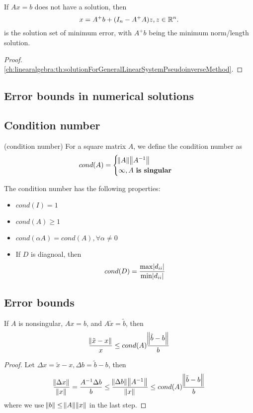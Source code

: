 \begin{refsection}
\begin{theorem}
	If $Ax = b$ does not have a solution, then
	$$x = A^+b + (I_n - A^+A)z, z\in \mathbb{R}^n.$$
	is the solution set of minimum error, with $A^+b$ being the minimum norm/length solution.
\end{theorem}
\begin{proof}
\autoref{ch:linearalgebra:th:solutionForGeneralLinearSystemPseudoinverseMethod}.
\end{proof}


\subsection{Error bounds in numerical solutions}
\subsection{Condition number}
\begin{definition}
(condition number) For a square matrix $A$, we define the condition number as
$$cond(A) = \begin{cases}
        \norm{A}\norm{A^{-1}}\\
        \infty, A ~\textbf{is singular}
\end{cases}$$
\end{definition}

\begin{lemma}\cite{Robinson2015nonlinear}
The condition number has the following properties:
\begin{itemize}
    \item $cond(I) = 1$
    \item $cond(A) \geq 1$
    \item $cond(\alpha A) = cond(A), \forall \alpha \neq 0$
    \item If $D$ is diagnoal, then
    $$cond(D)=\frac{\max{\abs{d_{ii}}}}{\min{\abs{d_{ii}}}}$$
\end{itemize}
\end{lemma}

\subsection{Error bounds}
\begin{theorem}
If $A$ is nonsingular, $Ax=b$, and $A\tilde{x}=\tilde{b}$, then \cite{Robinson2015nonlinear}
$$\frac{\norm{\tilde{x}-x}}{x} \leq cond(A)\frac{\norm{\tilde{b}-b}}{b}$$
\end{theorem}
\begin{proof}
 Let $\Delta x = \tilde{x}-x,\Delta b = \tilde{b}-b$, then 
$$\frac{\norm{\Delta x}}{\norm{x}} = \frac{A^{-1}\Delta b}{b} \leq \frac{\norm{\Delta b}\norm{A^{-1}}}{\norm{x}} \leq cond(A)\frac{\norm{\tilde{b}-b}}{b}$$
where we use $\norm{b}\leq \norm{A}\norm{x}$ in the last step.	
\end{proof}



\end{refsection}
